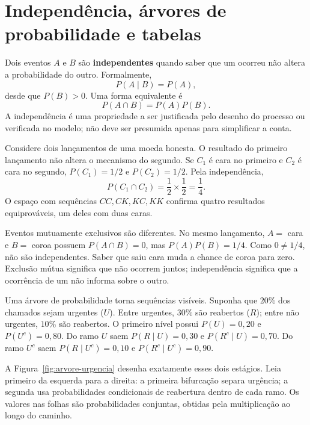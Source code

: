 \section{Independência, árvores de probabilidade e tabelas}

Dois eventos $A$ e $B$ são \textbf{independentes} quando saber que um ocorreu não altera a probabilidade do outro. Formalmente,
\[
P(A\mid B)=P(A),
\]
desde que $P(B)>0$. Uma forma equivalente é
\[
P(A\cap B)=P(A)P(B).
\]
A independência é uma propriedade a ser justificada pelo desenho do processo ou verificada no modelo; não deve ser presumida apenas para simplificar a conta.

Considere dois lançamentos de uma moeda honesta. O resultado do primeiro lançamento não altera o mecanismo do segundo. Se $C_1$ é cara no primeiro e $C_2$ é cara no segundo, $P(C_1)=1/2$ e $P(C_2)=1/2$. Pela independência,
\[
P(C_1\cap C_2)=\frac{1}{2}\times\frac{1}{2}=\frac{1}{4}.
\]
O espaço com sequências ${CC,CK,KC,KK}$ confirma quatro resultados equiprováveis, um deles com duas caras.

Eventos mutuamente exclusivos são diferentes. No mesmo lançamento, $A=$ cara e $B=$ coroa possuem $P(A\cap B)=0$, mas $P(A)P(B)=1/4$. Como $0\neq1/4$, não são independentes. Saber que saiu cara muda a chance de coroa para zero. Exclusão mútua significa que não ocorrem juntos; independência significa que a ocorrência de um não informa sobre o outro.

Uma árvore de probabilidade torna sequências visíveis. Suponha que $20\%$ dos chamados sejam urgentes ($U$). Entre urgentes, $30\%$ são reabertos ($R$); entre não urgentes, $10\%$ são reabertos. O primeiro nível possui $P(U)=0{,}20$ e $P(U^c)=0{,}80$. Do ramo $U$ saem $P(R\mid U)=0{,}30$ e $P(R^c\mid U)=0{,}70$. Do ramo $U^c$ saem $P(R\mid U^c)=0{,}10$ e $P(R^c\mid U^c)=0{,}90$.

A Figura~\ref{fig:arvore-urgencia} desenha exatamente esses dois estágios. Leia primeiro da esquerda para a direita: a primeira bifurcação separa urgência; a segunda usa probabilidades condicionais de reabertura dentro de cada ramo. Os valores nas folhas são probabilidades conjuntas, obtidas pela multiplicação ao longo do caminho.

